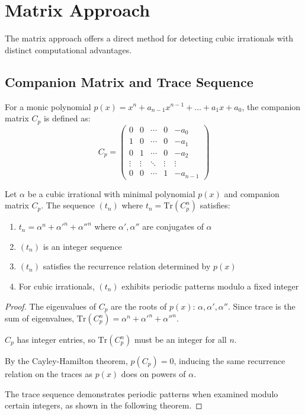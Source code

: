 \section{Matrix Approach}\label{sec:matrix_approach}

The matrix approach offers a direct method for detecting cubic irrationals with distinct computational advantages.

\subsection{Companion Matrix and Trace Sequence}

\begin{definition}
For a monic polynomial $p(x) = x^n + a_{n-1}x^{n-1} + \ldots + a_1x + a_0$, the companion matrix $C_p$ is defined as:
\begin{equation}
C_p = \begin{pmatrix}
0 & 0 & \cdots & 0 & -a_0 \\
1 & 0 & \cdots & 0 & -a_1 \\
0 & 1 & \cdots & 0 & -a_2 \\
\vdots & \vdots & \ddots & \vdots & \vdots \\
0 & 0 & \cdots & 1 & -a_{n-1}
\end{pmatrix}
\end{equation}
\end{definition}

\begin{theorem}
Let $\alpha$ be a cubic irrational with minimal polynomial $p(x)$ and companion matrix $C_p$. The sequence $(t_n)$ where $t_n = \text{Tr}(C_p^n)$ satisfies:
\begin{enumerate}
    \item $t_n = \alpha^n + \alpha'^n + \alpha''^n$ where $\alpha', \alpha''$ are conjugates of $\alpha$
    \item $(t_n)$ is an integer sequence
    \item $(t_n)$ satisfies the recurrence relation determined by $p(x)$
    \item For cubic irrationals, $(t_n)$ exhibits periodic patterns modulo a fixed integer
\end{enumerate}
\end{theorem}

\begin{proof}
The eigenvalues of $C_p$ are the roots of $p(x)$: $\alpha, \alpha', \alpha''$. Since trace is the sum of eigenvalues, $\text{Tr}(C_p^n) = \alpha^n + \alpha'^n + \alpha''^n$. 

$C_p$ has integer entries, so $\text{Tr}(C_p^n)$ must be an integer for all $n$. 

By the Cayley-Hamilton theorem, $p(C_p) = 0$, inducing the same recurrence relation on the traces as $p(x)$ does on powers of $\alpha$.

The trace sequence demonstrates periodic patterns when examined modulo certain integers, as shown in the following theorem.
\end{proof}

